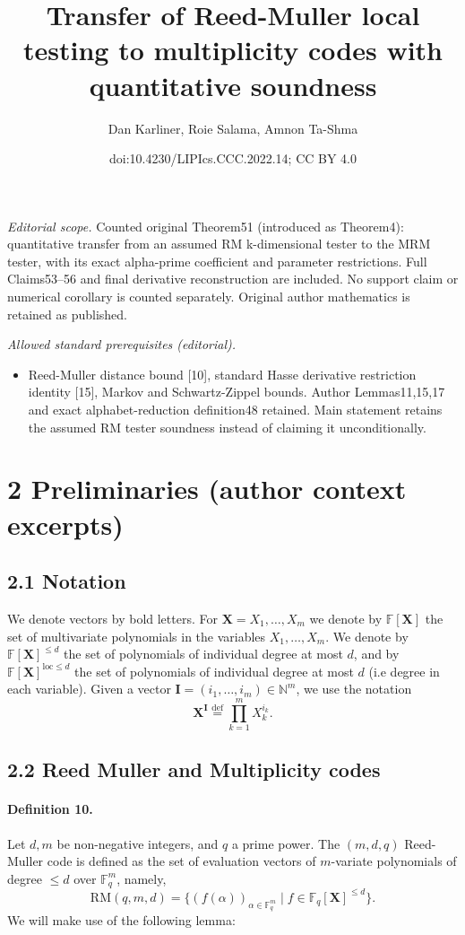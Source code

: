 \documentclass[10pt,a4paper]{article}
\title{Transfer of Reed-Muller local testing to multiplicity codes with quantitative soundness}
\author{Dan Karliner, Roie Salama, Amnon Ta-Shma}
\date{doi:10.4230/LIPIcs.CCC.2022.14; CC BY 4.0}
\begin{document}
\maketitle
\noindent\textit{Editorial scope.} Counted original Theorem51 (introduced as Theorem4): quantitative transfer from an assumed RM k-dimensional tester to the MRM tester, with its exact alpha-prime coefficient and parameter restrictions. Full Claims53–56 and final derivative reconstruction are included. No support claim or numerical corollary is counted separately. Original author mathematics is retained as published.\par\medskip
\noindent\textit{Allowed standard prerequisites (editorial).}\begin{itemize}
\item Reed-Muller distance bound [10], standard Hasse derivative restriction identity [15], Markov and Schwartz-Zippel bounds. Author Lemmas11,15,17 and exact alphabet-reduction definition48 retained. Main statement retains the assumed RM tester soundness instead of claiming it unconditionally.
\end{itemize}\medskip
\section*{2 Preliminaries (author context excerpts)}
\subsection*{2.1 Notation}
We denote vectors by bold letters. For $\boldsymbol X=X_1,\ldots,X_m$ we denote by $\mathbb F[\boldsymbol X]$ the set of multivariate polynomials in the variables $X_1,\ldots,X_m$. We denote by $\mathbb F[\boldsymbol X]^{\leq d}$ the set of polynomials of individual degree at most $d$, and by $\mathbb F[\boldsymbol X]^{\mathrm{loc}\leq d}$ the set of polynomials of individual degree at most $d$ (i.e degree in each variable). Given a vector $\boldsymbol I=(i_1,\ldots,i_m)\in\mathbb N^m$, we use the notation
\[\boldsymbol X^{\boldsymbol I}\stackrel{\mathrm{def}}=\prod_{k=1}^mX_k^{i_k}.\]
\subsection*{2.2 Reed Muller and Multiplicity codes}
\paragraph{Definition 10.} Let $d,m$ be non-negative integers, and $q$ a prime power. The $(m,d,q)$ Reed-Muller code is defined as the set of evaluation vectors of $m$-variate polynomials of degree $\leq d$ over $\mathbb F_q^m$, namely,
\[\mathrm{RM}(q,m,d)=\{(f(\alpha))_{\alpha\in\mathbb F_q^m}\mid f\in\mathbb F_q[\boldsymbol X]^{\leq d}\}.\]
We will make use of the following lemma:
\end{document}
